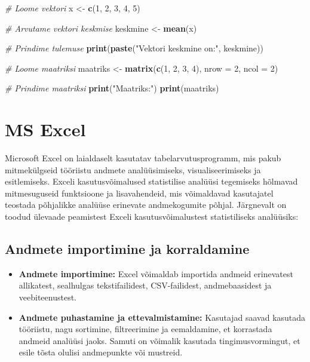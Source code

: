 \documentclass[
]{book}
\newenvironment{Shaded}{\begin{snugshade}}{\end{snugshade}}
\newcommand{\AttributeTok}[1]{\textcolor[rgb]{0.13,0.29,0.53}{#1}}
\newcommand{\CommentTok}[1]{\textcolor[rgb]{0.56,0.35,0.01}{\textit{#1}}}
\newcommand{\DecValTok}[1]{\textcolor[rgb]{0.00,0.00,0.81}{#1}}
\newcommand{\FunctionTok}[1]{\textcolor[rgb]{0.13,0.29,0.53}{\textbf{#1}}}
\newcommand{\NormalTok}[1]{#1}
\newcommand{\OtherTok}[1]{\textcolor[rgb]{0.56,0.35,0.01}{#1}}
\newcommand{\StringTok}[1]{\textcolor[rgb]{0.31,0.60,0.02}{#1}}
\providecommand{\tightlist}{%
  \setlength{\itemsep}{0pt}\setlength{\parskip}{0pt}}
\renewenvironment{Shaded} {\begin{snugshade}\footnotesize} {\end{snugshade}}
\begin{document}
\begin{Shaded}
\begin{Highlighting}[]
\CommentTok{\# Loome vektori}
\NormalTok{x }\OtherTok{\textless{}{-}} \FunctionTok{c}\NormalTok{(}\DecValTok{1}\NormalTok{, }\DecValTok{2}\NormalTok{, }\DecValTok{3}\NormalTok{, }\DecValTok{4}\NormalTok{, }\DecValTok{5}\NormalTok{)}

\CommentTok{\# Arvutame vektori keskmise}
\NormalTok{keskmine }\OtherTok{\textless{}{-}} \FunctionTok{mean}\NormalTok{(x)}

\CommentTok{\# Prindime tulemuse}
\FunctionTok{print}\NormalTok{(}\FunctionTok{paste}\NormalTok{(}\StringTok{"Vektori keskmine on:"}\NormalTok{, keskmine))}

\CommentTok{\# Loome maatriksi}
\NormalTok{maatriks }\OtherTok{\textless{}{-}} \FunctionTok{matrix}\NormalTok{(}\FunctionTok{c}\NormalTok{(}\DecValTok{1}\NormalTok{, }\DecValTok{2}\NormalTok{, }\DecValTok{3}\NormalTok{, }\DecValTok{4}\NormalTok{), }\AttributeTok{nrow =} \DecValTok{2}\NormalTok{, }\AttributeTok{ncol =} \DecValTok{2}\NormalTok{)}

\CommentTok{\# Prindime maatriksi}
\FunctionTok{print}\NormalTok{(}\StringTok{"Maatriks:"}\NormalTok{)}
\FunctionTok{print}\NormalTok{(maatriks)}
\end{Highlighting}
\end{Shaded}

\section{MS Excel}\label{ms-excel}

Microsoft Excel on laialdaselt kasutatav tabelarvutusprogramm, mis pakub mitmekülgseid tööriistu andmete analüüsimiseks, visualiseerimiseks ja esitlemiseks. Exceli kasutusvõimalused statistilise analüüsi tegemiseks hõlmavad mitmesuguseid funktsioone ja lisavahendeid, mis võimaldavad kasutajatel teostada põhjalikke analüüse erinevate andmekogumite põhjal. Järgnevalt on toodud ülevaade peamistest Exceli kasutusvõimalustest statistiliseks analüüsiks:

\subsection{Andmete importimine ja korraldamine}\label{andmete-importimine-ja-korraldamine}

\begin{itemize}
\tightlist
\item
  \textbf{Andmete importimine:} Excel võimaldab importida andmeid erinevatest allikatest, sealhulgas tekstifailidest, CSV-failidest, andmebaasidest ja veebiteenustest.
\item
  \textbf{Andmete puhastamine ja ettevalmistamine:} Kasutajad saavad kasutada tööriistu, nagu sortimine, filtreerimine ja eemaldamine, et korrastada andmeid analüüsi jaoks. Samuti on võimalik kasutada tingimusvormingut, et esile tõsta olulisi andmepunkte või mustreid.
\end{itemize}
\end{document}

